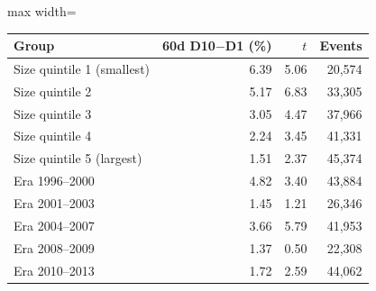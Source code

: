 {\small
\begin{adjustbox}{max width=\linewidth}
\begin{tabular}{lrrr}
\toprule
Group & 60d D10$-$D1 (\%) & $t$ & Events \\
\midrule
Size quintile 1 (smallest) & 6.39 & 5.06 & 20{,}574 \\
Size quintile 2 & 5.17 & 6.83 & 33{,}305 \\
Size quintile 3 & 3.05 & 4.47 & 37{,}966 \\
Size quintile 4 & 2.24 & 3.45 & 41{,}331 \\
Size quintile 5 (largest) & 1.51 & 2.37 & 45{,}374 \\
\midrule
Era 1996--2000 & 4.82 & 3.40 & 43{,}884 \\
Era 2001--2003 & 1.45 & 1.21 & 26{,}346 \\
Era 2004--2007 & 3.66 & 5.79 & 41{,}953 \\
Era 2008--2009 & 1.37 & 0.50 & 22{,}308 \\
Era 2010--2013 & 1.72 & 2.59 & 44{,}062 \\
\bottomrule
\end{tabular}
\end{adjustbox}
}
